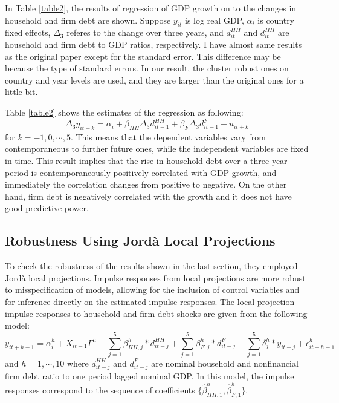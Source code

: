 \documentclass{ltjarticle}
\begin{document}
In Table \ref{table2}, the results of regression of GDP growth on to the changes in household and firm debt are shown. Suppose $y_{it}$ is log real GDP, $\alpha_{i}$ is country fixed effects, $\Delta_{3}$ referes to the change over three years, and $d_{it}^{HH} $ and $d_{it}^{HH}$ are household and firm debt to GDP ratios, respectively. I have almost same results as the original paper except for the standard error. This difference may be because the type of standard errors. In our result, the cluster robust ones on country and year levels are used, and they are larger than the original ones for a little bit. 

Table \ref{table2} shows the estimates of the regression as following:
\begin{equation*}
    \Delta_{3}y_{it+k}=\alpha_{i}+\beta_{HH}\Delta_{3}d_{it-1}^{HH}+\beta_{F}\Delta_{3}d_{it-1}^{F}+u_{it+k}
\end{equation*}
for $k=-1,0,\cdots,5$. This means that the dependent variables vary from contemporaneous to further future ones, while the independent variables are fixed in time. This result implies that the rise in household debt over a three year period is contemporaneously positively correlated with GDP growth, and immediately the correlation changes from positive to negative. On the other hand, firm debt is negatively correlated with the growth and it does not have good predictive power. 

\subsection{Robustness Using Jord\`a Local Projections}
To check the robustness of the results shown in the last section, they employed Jord\`a local projections. Impulse responses from local projections are more robust to misspecification of models, allowing for the inclusion of control variables and for inference directly on the estimated impulse responses. The local projection impulse responses to household and firm debt shocks are given from the following model:
\begin{equation*}
    y_{it+h-1}=\alpha_{i}^{h}+X_{it-1}\Gamma^{h}+\sum_{j=1}^{5}\beta_{HH,j}^{h}\ast d_{it-j}^{HH}+\sum_{j=1}^{5}\beta_{F,j}^{h}\ast d_{it-j}^{F}+\sum_{j=1}^{5}\delta_{j}^{h}\ast y_{it-j}+\epsilon_{it+h-1}^{h}
\end{equation*}
and $h=1,\cdots,10$ where $d_{it-j}^{HH} $ and $d_{it-j}^{F}$ are nominal household and nonfinancial firm debt ratio to one period lagged nominal GDP. In this model, the impulse responses correspond to the sequence of coefficients $\{\hat{\beta}_{HH,1}^{h},\hat{\beta}_{F,1}^{h}\}$. 
\end{document}
